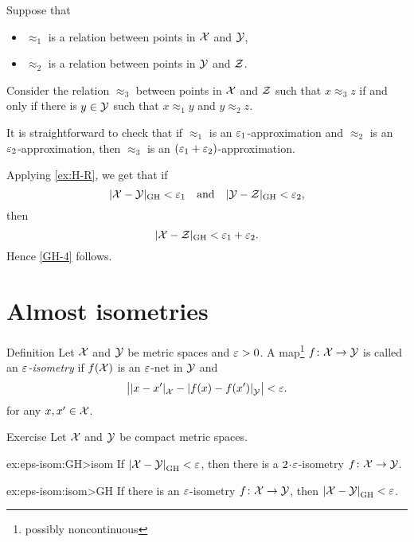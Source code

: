 Suppose that 
\begin{itemize}
\item $\approx_1$ is a relation between points in $\mathcal{X}$ and $\mathcal{Y}$,
\item $\approx_2$ is a relation between points in $\mathcal{Y}$ and $\mathcal{Z}$.
\end{itemize}
Consider the relation $\approx_3$ between points in $\mathcal{X}$ and $\mathcal{Z}$ such that
$x\approx_3 z$ if and only if there is $y\in  \mathcal{Y}$ such that 
$x\approx_1 y$ and $y\approx_2 z$.

It is straightforward to check that if $\approx_1$ is an $\varepsilon_1$-approximation and $\approx_2$ is an $\varepsilon_2$-approximation, then $\approx_3$ is an $(\varepsilon_1+\varepsilon_2)$-approximation.

Applying \ref{ex:H-R}, we get that if 
\[|\mathcal{X}-\mathcal{Y}|_{\operatorname{\rm GH}\nolimits}<\varepsilon_1
\quad\text{and}\quad
|\mathcal{Y}-\mathcal{Z}|_{\operatorname{\rm GH}\nolimits}<\varepsilon_2,
\]
then 
\[|\mathcal{X}-\mathcal{Z}|_{\operatorname{\rm GH}\nolimits}<\varepsilon_1+\varepsilon_2.\]
Hence \ref{GH-4} follows.
\qeds


\section{Almost isometries}\label{sec:alm-isom}

\begin{thm}{Definition} Let $\mathcal{X}$ and $\mathcal{Y}$ be metric spaces and $\varepsilon>0$. 
A  map\footnote{possibly noncontinuous} $f\: \spc{X} \z\to \spc{Y}$ is called an \emph{$\varepsilon$-isometry} 
if $f(\mathcal{X})$ is an $\varepsilon$-net in $\mathcal{Y}$ and
\[\bigl|\dist{x}{x'}{\spc{X}}-\dist{f(x)}{f(x')}{\spc{Y}}\bigr|<\eps.\]
for any $x,x'\in \mathcal{X}$.
\end{thm}

\begin{thm}{Exercise}\label{ex:eps-isom}
Let $\mathcal{X}$ and $\mathcal{Y}$ be compact metric spaces.

\begin{subthm}{ex:eps-isom:GH>isom}
If $\dist{\spc{X}}{\spc{Y}}{\GH}<\eps$, then there is a $2\cdot\eps$-isometry $f\colon\mathcal{X}\to\mathcal{Y}$.
\end{subthm}

\begin{subthm}{ex:eps-isom:isom>GH}
If there is an $\varepsilon$-isometry $f\colon\mathcal{X}\to\mathcal{Y}$, then $\dist{\spc{X}}{\spc{Y}}{\GH}<\eps$.
\end{subthm}

\end{thm}

